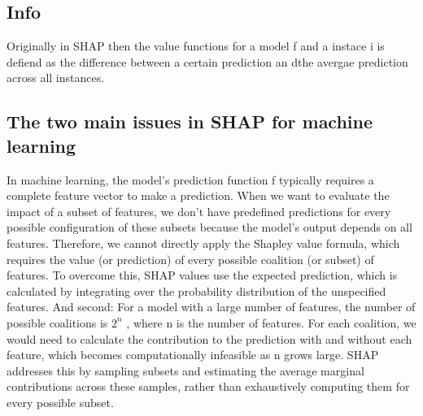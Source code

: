 \documentclass[12pt]{article}
\begin{document}
	\subsection{Info}
	Originally in SHAP then the value functions for a model f and a instace i is defiend as the difference between a certain prediction an dthe avergae prediction across all instances. 
	
	\subsection{The two main issues in SHAP for machine learning}
	In machine learning, the model's prediction function 
	f typically requires a complete feature vector to make a prediction. When we want to evaluate the impact of a subset of features, we don't have predefined predictions for every possible configuration of these subsets because the model's output depends on all features. Therefore, we cannot directly apply the Shapley value formula, which requires the value (or prediction) of every possible coalition (or subset) of features. To overcome this, SHAP values use the expected prediction, which is calculated by integrating over the probability distribution of the unspecified features. And second: For a model with a large number of features, the number of possible coalitions is $2^n$
	, where n is the number of features. For each coalition, we would need to calculate the contribution to the prediction with and without each feature, which becomes computationally infeasible as n grows large. SHAP addresses this by sampling subsets and estimating the average marginal contributions across these samples, rather than exhaustively computing them for every possible subset.
	
\end{document}

